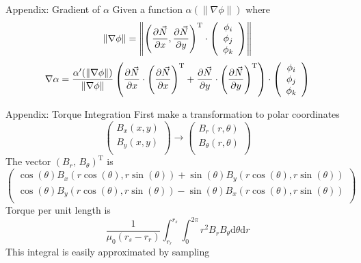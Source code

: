 \documentclass{beamer}
\newcommand\norm[1]{\left\lVert#1\right\rVert}
\begin{document}
    \begin{frame}[fragile]{Appendix: Gradient of $\alpha$}
        Given a function $\alpha(\|\nabla\phi\|)$ where
        \[\norm{\nabla\phi}=\norm{\left(\pdv{\vec{N}}{x}, \pdv{\vec{N}}{y} \right)^{\text{T}}\cdot \left(
        \begin{array}{c}
            \phi _i \\
            \phi _j \\
            \phi _k \\
        \end{array}
        \right)}\]
        \[\nabla\alpha=\frac{\alpha'(\norm{\nabla\phi})}{\norm{\nabla\phi}}
        \left(\pdv{\vec{N}}{x}\cdot\left(\pdv{\vec{N}}{x}\right)^{\text{T}}+
        \pdv{\vec{N}}{y}\cdot\left(\pdv{\vec{N}}{y}\right)^{\text{T}}\right)\cdot \left(
        \begin{array}{c}
            \phi _i \\
            \phi _j \\
            \phi _k \\
        \end{array}
        \right)\]
    \end{frame}
    \begin{frame}{Appendix: Torque Integration}
        First make a transformation to polar coordinates
        \[\left(
        \begin{array}{c}
           B_x(x,y) \\
           B_y(x,y) \\
        \end{array}
        \right) \to \left(
        \begin{array}{c}
            B_r(r,\theta) \\
            B_{\theta}(r,\theta) \\
        \end{array}
        \right) \]
        The vector $\left( B_r,\,B_{\theta} \right)^{\text{T}}$ is
        \[\left(
        \begin{array}{c}
            \cos (\theta )B_x(r \cos (\theta ),r \sin (\theta ))+\sin (\theta )B_y(r \cos (\theta ),r \sin (\theta )) \\
            \cos (\theta )B_y(r \cos (\theta ),r \sin (\theta ))-\sin (\theta )B_x(r \cos (\theta ),r \sin (\theta )) \\
        \end{array}
        \right)\]
        Torque per unit length is
        \[
            \frac{1}{\mu_0 (r_s-r_r)}\int_{r_r}^{r_s}\int_{0}^{2\pi} r^{2}B_r B_{\theta}\mathrm{d}\theta\mathrm{d}r
        \]
        This integral is easily approximated by sampling
    \end{frame}
\end{document}
